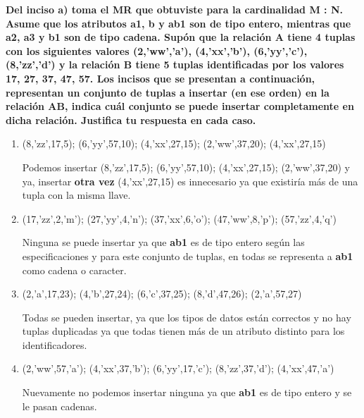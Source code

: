 \textbf{Del inciso a) toma el MR que obtuviste para la cardinalidad M : N. Asume que los atributos a1, b y ab1 son de tipo
entero, mientras que a2, a3 y b1 son de tipo cadena. Supón que la relación A tiene 4 tuplas con los siguientes valores
(2,’ww’,’a’), (4,’xx’,’b’), (6,’yy’,’c’), (8,’zz’,’d’) y la relación B tiene 5 tuplas identificadas por
los valores 17, 27, 37, 47, 57. Los incisos que se presentan a continuación, representan un conjunto de tuplas
a insertar (en ese orden) en la relación AB, indica cuál conjunto se puede insertar completamente en dicha relación.
Justifica tu respuesta en cada caso.}\vspace{.3cm}

\begin{enumerate}
    \item (8,’zz’,17,5); (6,’yy’,57,10); (4,’xx’,27,15); (2,’ww’,37,20); (4,’xx’,27,15)
    
    Podemos insertar (8,’zz’,17,5); (6,’yy’,57,10); (4,’xx’,27,15); (2,’ww’,37,20) y ya, insertar \textbf{otra vez} (4,’xx’,27,15) es innecesario ya que existiría más de una tupla con la misma llave.

    \item (17,’zz’,2,’m’); (27,’yy’,4,’n’); (37,’xx’,6,’o’); (47,’ww’,8,’p’); (57,’zz’,4,’q’)
    
    Ninguna se puede insertar ya que \textbf{ab1} es de tipo entero según las especificaciones y para este conjunto de tuplas, en todas se representa a \textbf{ab1} como cadena o caracter. 

    \item (2,’a’,17,23); (4,’b’,27,24); (6,’c’,37,25); (8,’d’,47,26); (2,’a’,57,27)
    
    Todas se pueden insertar, ya que los tipos de datos están correctos y no hay tuplas duplicadas ya que todas tienen más de un atributo distinto para los identificadores. 

    \item (2,’ww’,57,’a’); (4,’xx’,37,’b’); (6,’yy’,17,’c’); (8,’zz’,37,’d’); (4,’xx’,47,’a’)
    
    Nuevamente no podemos insertar ninguna ya que \textbf{ab1} es de tipo entero y se le pasan cadenas. 
\end{enumerate}

\vspace{.5cm}
